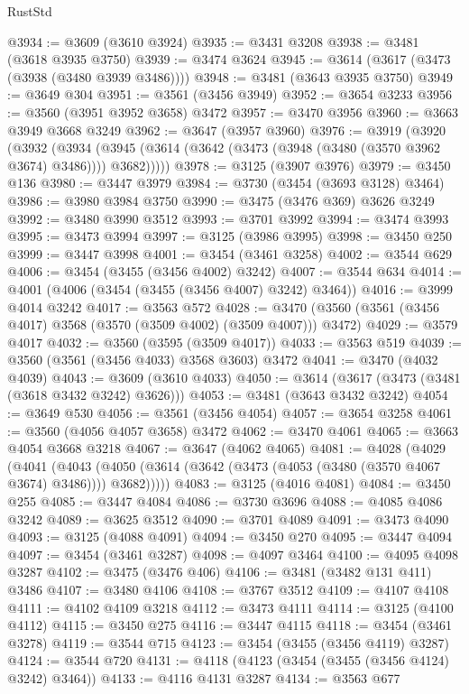 \begin{lexlean}{RustStd}
\begin{coremodule}
@3934 := @3609 (@3610 @3924)
@3935 := @3431 @3208
@3938 := @3481 (@3618 @3935 @3750)
@3939 := @3474 @3624
@3945 := @3614 (@3617 (@3473 (@3938 (@3480 @3939 @3486))))
@3948 := @3481 (@3643 @3935 @3750)
@3949 := @3649 @304
@3951 := @3561 (@3456 @3949)
@3952 := @3654 @3233
@3956 := @3560 (@3951 @3952 @3658) @3472
@3957 := @3470 @3956
@3960 := @3663 @3949 @3668 @3249
@3962 := @3647 (@3957 @3960)
@3976 := @3919
    (@3920
      (@3932
        (@3934 (@3945 (@3614 (@3642 (@3473 (@3948 (@3480 (@3570 @3962 @3674) @3486)))) @3682)))))
@3978 := @3125 (@3907 @3976)
@3979 := @3450 @136
@3980 := @3447 @3979
@3984 := @3730 (@3454 (@3693 @3128) @3464)
@3986 := @3980 @3984 @3750
@3990 := @3475 (@3476 @369) @3626 @3249
@3992 := @3480 @3990 @3512
@3993 := @3701 @3992
@3994 := @3474 @3993
@3995 := @3473 @3994
@3997 := @3125 (@3986 @3995)
@3998 := @3450 @250
@3999 := @3447 @3998
@4001 := @3454 (@3461 @3258)
@4002 := @3544 @629
@4006 := @3454 (@3455 (@3456 @4002) @3242)
@4007 := @3544 @634
@4014 := @4001 (@4006 (@3454 (@3455 (@3456 @4007) @3242) @3464))
@4016 := @3999 @4014 @3242
@4017 := @3563 @572
@4028 := @3470 (@3560 (@3561 (@3456 @4017) @3568 (@3570 (@3509 @4002) (@3509 @4007))) @3472)
@4029 := @3579 @4017
@4032 := @3560 (@3595 (@3509 @4017))
@4033 := @3563 @519
@4039 := @3560 (@3561 (@3456 @4033) @3568 @3603) @3472
@4041 := @3470 (@4032 @4039)
@4043 := @3609 (@3610 @4033)
@4050 := @3614 (@3617 (@3473 (@3481 (@3618 @3432 @3242) @3626)))
@4053 := @3481 (@3643 @3432 @3242)
@4054 := @3649 @530
@4056 := @3561 (@3456 @4054)
@4057 := @3654 @3258
@4061 := @3560 (@4056 @4057 @3658) @3472
@4062 := @3470 @4061
@4065 := @3663 @4054 @3668 @3218
@4067 := @3647 (@4062 @4065)
@4081 := @4028
    (@4029
      (@4041
        (@4043 (@4050 (@3614 (@3642 (@3473 (@4053 (@3480 (@3570 @4067 @3674) @3486)))) @3682)))))
@4083 := @3125 (@4016 @4081)
@4084 := @3450 @255
@4085 := @3447 @4084
@4086 := @3730 @3696
@4088 := @4085 @4086 @3242
@4089 := @3625 @3512
@4090 := @3701 @4089
@4091 := @3473 @4090
@4093 := @3125 (@4088 @4091)
@4094 := @3450 @270
@4095 := @3447 @4094
@4097 := @3454 (@3461 @3287)
@4098 := @4097 @3464
@4100 := @4095 @4098 @3287
@4102 := @3475 (@3476 @406)
@4106 := @3481 (@3482 @131 @411) @3486
@4107 := @3480 @4106
@4108 := @3767 @3512
@4109 := @4107 @4108
@4111 := @4102 @4109 @3218
@4112 := @3473 @4111
@4114 := @3125 (@4100 @4112)
@4115 := @3450 @275
@4116 := @3447 @4115
@4118 := @3454 (@3461 @3278)
@4119 := @3544 @715
@4123 := @3454 (@3455 (@3456 @4119) @3287)
@4124 := @3544 @720
@4131 := @4118 (@4123 (@3454 (@3455 (@3456 @4124) @3242) @3464))
@4133 := @4116 @4131 @3287
@4134 := @3563 @677

\end{coremodule}
\end{lexlean}
